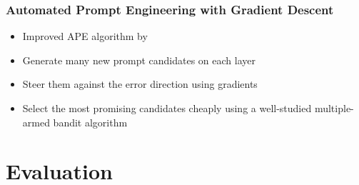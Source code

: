 \documentclass{sdqbeamer}
\begin{document}
\begin{frame}[picture 50 vertical, picture=images/gradient_descent.pdf]
\frametitle{Automated Prompt Engineering with Gradient Descent}
    \begin{itemize}
        \item Improved APE algorithm by \cite{pryzant2023AutomaticPrompt}
        \item Generate many new prompt candidates on each layer
        \item Steer them against the error direction using gradients
        \item Select the most promising candidates cheaply using a well-studied multiple-armed bandit algorithm
    \end{itemize}
    
\end{frame}


\section{Evaluation}
\end{document}
